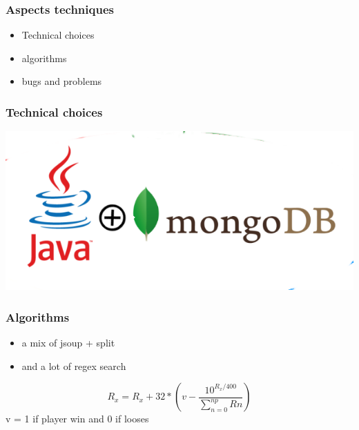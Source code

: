 \documentclass{beamer}
\begin{document}
\begin{frame}
  \frametitle{Aspects techniques}

  \begin{itemize}
  \item Technical choices
  \item algorithms
  \item bugs and problems
  \end{itemize}
\end{frame}


\begin{frame}
  \frametitle{Technical choices}
\begin{tcolorbox}[colback=green!5,colframe=green!40!black,title=The Core]
  \begin{center}
    \includegraphics[scale=0.30,keepaspectratio]{mongojava}
    \end{center}
\end{tcolorbox}
\end{frame}


\begin{frame}
  \frametitle{Algorithms}
\begin{tcolorbox}[colback=green!5,colframe=green!40!black,title=Parser]
  \begin{itemize}
  \item a mix of jsoup + split
  \item and a lot of regex search
  \end{itemize}
\end{tcolorbox}
\begin{tcolorbox}[colback=green!5,colframe=green!40!black,title=Elo]
  \[
    {R_{x}} = {R_{x}} + 32 * (v - \frac{10^{{R_{x}}/400}}{\sum_{n=0}^{np} Rn})
  \]
v = 1 if player win and 0 if looses
\end{tcolorbox}
\end{frame}
\end{document}
